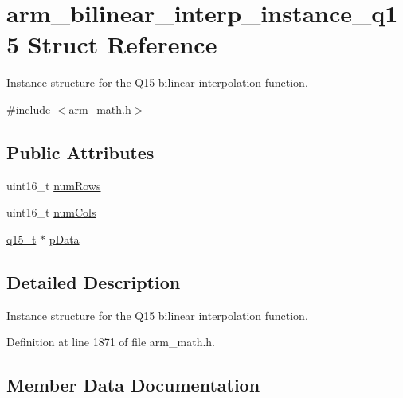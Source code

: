 \hypertarget{structarm__bilinear__interp__instance__q15}{}\section{arm\+\_\+bilinear\+\_\+interp\+\_\+instance\+\_\+q15 Struct Reference}
\label{structarm__bilinear__interp__instance__q15}


Instance structure for the Q15 bilinear interpolation function.  




{\ttfamily \#include $<$arm\+\_\+math.\+h$>$}

\subsection*{Public Attributes}
\begin{DoxyCompactItemize}
\item 
uint16\+\_\+t \hyperlink{structarm__bilinear__interp__instance__q15_a2130ae30a804995a9f5d0e2189e08565}{num\+Rows}
\item 
uint16\+\_\+t \hyperlink{structarm__bilinear__interp__instance__q15_a7fa8772d01583374ff8ac18205a26a37}{num\+Cols}
\item 
\hyperlink{arm__math_8h_ab5a8fb21a5b3b983d5f54f31614052ea}{q15\+\_\+t} $\ast$ \hyperlink{structarm__bilinear__interp__instance__q15_a50d75b1316cee3e0dfad6dcc4c9a2954}{p\+Data}
\end{DoxyCompactItemize}


\subsection{Detailed Description}
Instance structure for the Q15 bilinear interpolation function. 

Definition at line 1871 of file arm\+\_\+math.\+h.



\subsection{Member Data Documentation}
\mbox{\label{structarm__bilinear__interp__instance__q15_a7fa8772d01583374ff8ac18205a26a37}} 
